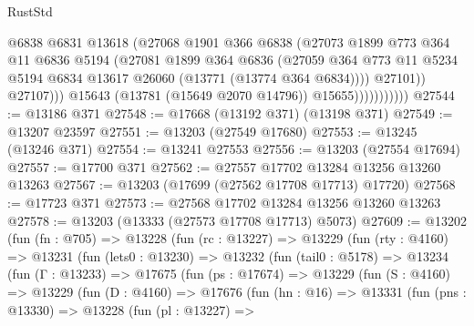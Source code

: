 \begin{lexlean}{RustStd}
\begin{coremodule}
                                @6838
                                @6831
                                @13618
                                (@27068
                                  @1901
                                  @366
                                  @6838
                                  (@27073
                                    @1899
                                    @773
                                    @364
                                    @11
                                    @6836
                                    @5194
                                    (@27081
                                      @1899
                                      @364
                                      @6836
                                      (@27059
                                        @364
                                        @773
                                        @11
                                        @5234
                                        @5194
                                        @6834
                                        @13617
                                        @26060
                                        (@13771 (@13774 @364 @6834))))
                                    @27101))
                                @27107)))
                          @15643
                          (@13781 (@15649 @2070 @14796))
                          @15655)))))))))))
@27544 := @13186 @371
@27548 := @17668 (@13192 @371) (@13198 @371)
@27549 := @13207 @23597
@27551 := @13203 (@27549 @17680)
@27553 := @13245 (@13246 @371)
@27554 := @13241 @27553
@27556 := @13203 (@27554 @17694)
@27557 := @17700 @371
@27562 := @27557 @17702 @13284 @13256 @13260 @13263
@27567 := @13203 (@17699 (@27562 @17708 @17713) @17720)
@27568 := @17723 @371
@27573 := @27568 @17702 @13284 @13256 @13260 @13263
@27578 := @13203 (@13333 (@27573 @17708 @17713) @5073)
@27609 := @13202
    (fun (fn : @705) =>
    @13228
      (fun (rc : @13227) =>
      @13229
        (fun (rty : @4160) =>
        @13231
          (fun (lets0 : @13230) =>
          @13232
            (fun (tail0 : @5178) =>
            @13234
              (fun (Γ : @13233) =>
              @17675
                (fun (ps : @17674) =>
                @13229
                  (fun (S : @4160) =>
                  @13229
                    (fun (D : @4160) =>
                    @17676
                      (fun (hn : @16) =>
                      @13331
                        (fun (pns : @13330) =>
                        @13228
                          (fun (pl : @13227) =>

\end{coremodule}
\end{lexlean}
